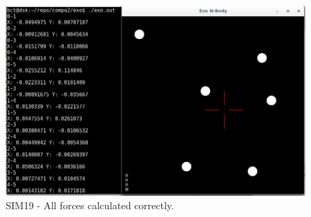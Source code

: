 \begin{figure}[H]
  \centering
  \includegraphics[width=\textwidth]{img/testingEvidence/sim19.png}
  \caption{SIM19 - All forces calculated correctly.}
\end{figure}

\pagebreak